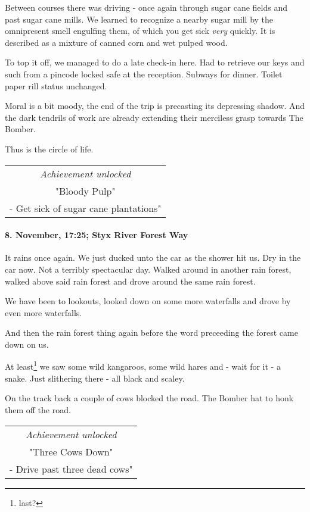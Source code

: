 Between courses there was driving - once again through sugar cane fields and past sugar cane mills.
We learned to recognize a nearby sugar mill by the omnipresent smell engulfing them, of which you get sick \emph{very} quickly.
It is described as a mixture of canned corn and wet pulped wood.

To top it off, we managed to do a late check-in here.
Had to retrieve our keys and such from a pincode locked safe at the reception.
Subways for dinner.
Toilet paper rill status unchanged.

Moral is a bit moody, the end of the trip is precasting its depressing shadow.
And the dark tendrils of work are already extending their merciless grasp towards The Bomber.

Thus is the circle of life.

\begin{center}
\begin{tabular}{||c||}
\emph{Achievement unlocked}\\
"Bloody Pulp"\\
\multicolumn{1}{||p{0.8\textwidth}||}{\footnotesize - Get sick of sugar cane plantations"} \\
\end{tabular}
\end{center}

\paragraph{8. November, 17:25; Styx River Forest Way}
It rains once again.
We just ducked unto the car as the shower hit us.
Dry in the car now.
Not a terribly spectacular day.
Walked around in another rain forest, walked above said rain forest and drove around the same rain forest.

We have been to lookouts, looked down on some more waterfalls and drove by even more waterfalls.

And then the rain forest thing again before the word preceeding the forest came down on us.

At least\footnote{last?} we saw some wild kangaroos, some wild hares and - wait for it - a snake.
Just slithering there - all black and scaley.

On the track back a couple of cows blocked the road.
The Bomber hat to honk them off the road.

\begin{center}
\begin{tabular}{||c||}
\emph{Achievement unlocked}\\
"Three Cows Down"\\
\multicolumn{1}{||p{0.8\textwidth}||}{\footnotesize - Drive past three dead cows"} \\
\end{tabular}
\end{center}

